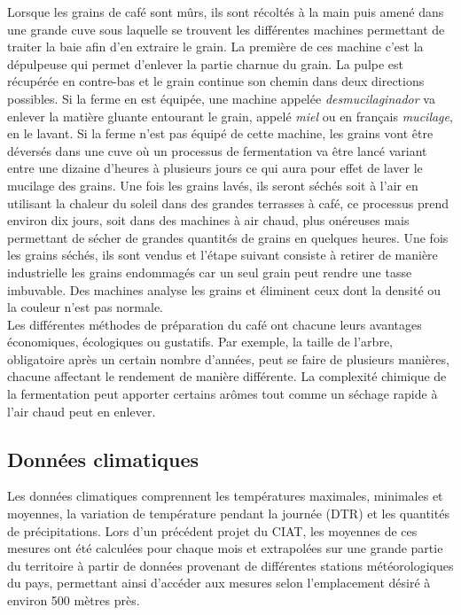 \noindent Lorsque les grains de café sont mûrs, ils sont récoltés à la main puis amené dans une grande cuve sous laquelle se trouvent les différentes machines permettant de traiter la baie afin d'en extraire le grain. La première de ces machine c'est la dépulpeuse qui permet d'enlever la partie charnue du grain. La pulpe est récupérée en contre-bas et le grain continue son chemin dans deux directions possibles. Si la ferme en est équipée, une machine appelée \textit{desmucilaginador} va enlever la matière gluante entourant le grain, appelé \textit{miel} ou en français \textit{mucilage}, en le lavant. Si la ferme n'est pas équipé de cette machine, les grains vont être déversés dans une cuve où un processus de fermentation va être lancé variant entre une dizaine d'heures à plusieurs jours ce qui aura pour effet de laver le mucilage des grains. Une fois les grains lavés, ils seront séchés soit à l'air en utilisant la chaleur du soleil dans des grandes terrasses à café, ce processus prend environ dix jours, soit dans des machines à air chaud, plus onéreuses mais permettant de sécher de grandes quantités de grains en quelques heures. Une fois les grains séchés, ils sont vendus et l'étape suivant consiste à retirer de manière industrielle les grains endommagés car un seul grain peut rendre une tasse imbuvable. Des machines analyse les grains et éliminent ceux dont la densité ou la couleur n'est pas normale.\cite{GuideCafe} \\

\noindent Les différentes méthodes de préparation du café ont chacune leurs avantages économiques, écologiques ou gustatifs. Par exemple, la taille de l'arbre, obligatoire après un certain nombre d'années, peut se faire de plusieurs manières, chacune affectant le rendement de manière différente. La complexité chimique de la fermentation peut apporter certains arômes tout comme un séchage rapide à l'air chaud peut en enlever.


 
\subsection{Données climatiques}
Les données climatiques comprennent les températures maximales, minimales et moyennes, la variation de température pendant la journée (DTR) et les quantités de précipitations. Lors d'un précédent projet du CIAT, les moyennes de ces mesures ont été calculées pour chaque mois et extrapolées sur une grande partie du territoire à partir de données provenant de différentes stations météorologiques du pays, permettant ainsi d’accéder aux mesures selon l’emplacement désiré à environ 500 mètres près. \\

